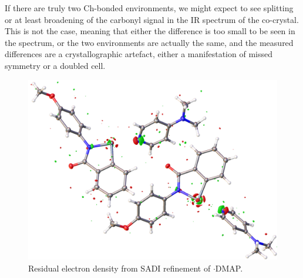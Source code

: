 \begin{refsection}

If there are truly two Ch-bonded environments, we might expect to see splitting or at least broadening of the carbonyl signal in the IR spectrum of the co-crystal.
This is not the case, meaning that either the difference is too small to be seen in the spectrum, or the two environments are actually the same, and the measured differences are a crystallographic artefact, either a manifestation of missed symmetry or a doubled cell.

\begin{figure}
  \centering
  \includegraphics[width=0.7\linewidth]{Figures/residual-dens.png}
  \caption{Residual electron density from SADI refinement of \texorpdfstring{$ \cdot $}{.}DMAP.}\label{fig:residual-dens}
\end{figure}


\end{refsection}
